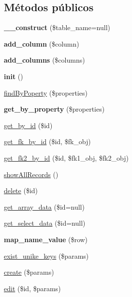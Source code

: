\subsection*{Métodos públicos}
\begin{DoxyCompactItemize}
\item 
\mbox{\label{class_model_a186f8fcbe8092f888ba40e4ecef9f6a5}} 
{\bfseries \+\_\+\+\_\+construct} (\$table\+\_\+name=null)
\item 
\mbox{\label{class_model_ab42dfa81494651af8757f81051d03faa}} 
{\bfseries add\+\_\+column} (\$column)
\item 
\mbox{\label{class_model_a8adf2b2c067639350b28d8058a384ac8}} 
{\bfseries add\+\_\+columns} (\$columns)
\item 
\mbox{\label{class_model_a907f3b1c1439c21be8fd9656bc834f38}} 
{\bfseries init} ()
\item 
\mbox{\hyperlink{class_model_a067c962b5ac1b38809aba6c8b7af46b1}{find\+By\+Poperty}} (\$properties)
\item 
\mbox{\label{class_model_a7d41415102cf7f720d7f1bff3ce68242}} 
{\bfseries get\+\_\+by\+\_\+property} (\$properties)
\item 
\mbox{\hyperlink{class_model_a708a0fc588b55e650ea0847da98f7b80}{get\+\_\+by\+\_\+id}} (\$id)
\item 
\mbox{\hyperlink{class_model_aca3b0fcfd538c6f2d0f1a05dfcea87ae}{get\+\_\+fk\+\_\+by\+\_\+id}} (\$id, \$fk\+\_\+obj)
\item 
\mbox{\hyperlink{class_model_af5ccad2ad89087e4454e71787163a6ba}{get\+\_\+fk2\+\_\+by\+\_\+id}} (\$id, \$fk1\+\_\+obj, \$fk2\+\_\+obj)
\item 
\mbox{\hyperlink{class_model_a7b1ac1e4fdca6e471ad62e21416c9ee7}{show\+All\+Records}} ()
\item 
\mbox{\hyperlink{class_model_ae045fb57af57685c24f2dbe5fbd7f684}{delete}} (\$id)
\item 
\mbox{\hyperlink{class_model_a62dd5265f2009c4111dc8117f815eb27}{get\+\_\+array\+\_\+data}} (\$id=null)
\item 
\mbox{\hyperlink{class_model_a85f2794443673870da8d4e34e1e3a307}{get\+\_\+select\+\_\+data}} (\$id=null)
\item 
\mbox{\label{class_model_a1465d4c58a91ed329132e52e60238ead}} 
{\bfseries map\+\_\+name\+\_\+value} (\$row)
\item 
\mbox{\hyperlink{class_model_afbf5f640ebb15823608a233cc3f2e8f5}{exist\+\_\+unike\+\_\+keys}} (\$params)
\item 
\mbox{\hyperlink{class_model_ab85f7264cd89a8180cacda746a089e9e}{create}} (\$params)
\item 
\mbox{\hyperlink{class_model_adae5eb27d36ae799ef4fa23dec88d302}{edit}} (\$id, \$params)
\end{DoxyCompactItemize}

